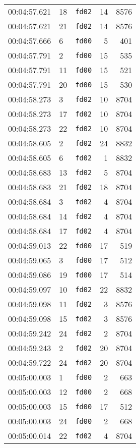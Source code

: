 \documentclass{article}
\begin{document}
\begin{longtable}{lllrr}
00:04:57.621 & 18 & \texttt{fd02} & 14 & 8576 \\
00:04:57.621 & 21 & \texttt{fd02} & 14 & 8576 \\
00:04:57.666 & 6 & \texttt{fd00} & 5 & 401 \\
00:04:57.791 & 2 & \texttt{fd00} & 15 & 535 \\
00:04:57.791 & 11 & \texttt{fd00} & 15 & 521 \\
00:04:57.791 & 20 & \texttt{fd00} & 15 & 530 \\
00:04:58.273 & 3 & \texttt{fd02} & 10 & 8704 \\
00:04:58.273 & 17 & \texttt{fd02} & 10 & 8704 \\
00:04:58.273 & 22 & \texttt{fd02} & 10 & 8704 \\
00:04:58.605 & 2 & \texttt{fd02} & 24 & 8832 \\
00:04:58.605 & 6 & \texttt{fd02} & 1 & 8832 \\
00:04:58.683 & 13 & \texttt{fd02} & 5 & 8704 \\
00:04:58.683 & 21 & \texttt{fd02} & 18 & 8704 \\
00:04:58.684 & 3 & \texttt{fd02} & 4 & 8704 \\
00:04:58.684 & 14 & \texttt{fd02} & 4 & 8704 \\
00:04:58.684 & 17 & \texttt{fd02} & 4 & 8704 \\
00:04:59.013 & 22 & \texttt{fd00} & 17 & 519 \\
00:04:59.065 & 3 & \texttt{fd00} & 17 & 512 \\
00:04:59.086 & 19 & \texttt{fd00} & 17 & 514 \\
00:04:59.097 & 10 & \texttt{fd02} & 22 & 8832 \\
00:04:59.098 & 11 & \texttt{fd02} & 3 & 8576 \\
00:04:59.098 & 15 & \texttt{fd02} & 3 & 8576 \\
00:04:59.242 & 24 & \texttt{fd02} & 2 & 8704 \\
00:04:59.243 & 2 & \texttt{fd02} & 20 & 8704 \\
00:04:59.722 & 24 & \texttt{fd02} & 20 & 8704 \\
00:05:00.003 & 1 & \texttt{fd00} & 2 & 663 \\
00:05:00.003 & 12 & \texttt{fd00} & 2 & 668 \\
00:05:00.003 & 15 & \texttt{fd00} & 17 & 512 \\
00:05:00.003 & 24 & \texttt{fd00} & 2 & 668 \\
00:05:00.014 & 22 & \texttt{fd02} & 4 & 8704 \\

\end{longtable}
\end{document}
